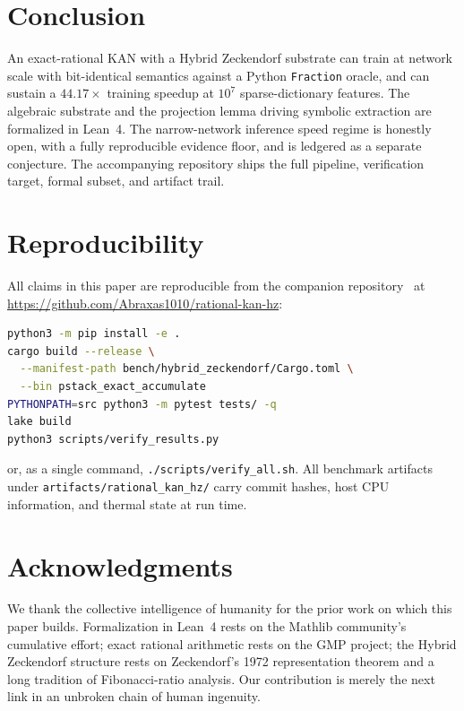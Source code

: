 \documentclass[11pt,a4paper]{article}
\begin{document}
\section{Conclusion}
\label{sec:conclusion}

An exact-rational KAN with a Hybrid Zeckendorf substrate can train at
network scale with bit-identical semantics against a Python
\texttt{Fraction} oracle, and can sustain a $44.17\times$ training
speedup at $10^{7}$ sparse-dictionary features. The algebraic substrate
and the projection lemma driving symbolic extraction are formalized in
Lean~4. The narrow-network inference speed regime is honestly
open, with a fully reproducible evidence floor, and is ledgered as a
separate conjecture. The accompanying repository ships the full
pipeline, verification target, formal subset, and artifact trail.

\section*{Reproducibility}

\noindent All claims in this paper are reproducible from the companion
repository~\cite{apoth3osis_rkan_hz_2026} at
\url{https://github.com/Abraxas1010/rational-kan-hz}:

\begin{lstlisting}[language=bash,basicstyle=\footnotesize\ttfamily]
python3 -m pip install -e .
cargo build --release \
  --manifest-path bench/hybrid_zeckendorf/Cargo.toml \
  --bin pstack_exact_accumulate
PYTHONPATH=src python3 -m pytest tests/ -q
lake build
python3 scripts/verify_results.py
\end{lstlisting}

\noindent or, as a single command, \texttt{./scripts/verify\_all.sh}. All
benchmark artifacts under \texttt{artifacts/rational\_kan\_hz/} carry
commit hashes, host CPU information, and thermal state at run time.

\section*{Acknowledgments}

We thank the collective intelligence of humanity for the prior work on
which this paper builds. Formalization in Lean~4 rests on the Mathlib
community's cumulative effort; exact rational arithmetic rests on the
GMP project; the Hybrid Zeckendorf structure rests on Zeckendorf's 1972
representation theorem and a long tradition of Fibonacci-ratio analysis.
Our contribution is merely the next link in an unbroken chain of human
ingenuity.
\end{document}
